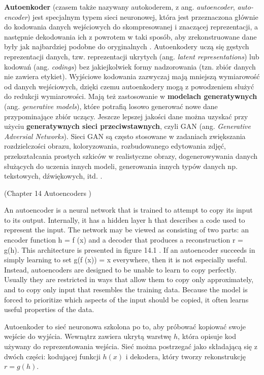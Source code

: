 \documentclass[12pt]{mwbk}
\theoremstyle{plain}
\theoremstyle{definition}
\theoremstyle{remark}
\begin{document}
	\textbf{Autoenkoder} (czasem także nazywany autokoderem, z ang. \textit{autoencoder}, \textit{auto-encoder}) jest specjalnym typem sieci neuronowej, która jest przeznaczona głównie do kodowania danych wejściowych do skompresowanej i znaczącej reprezentacji, a następnie dekodowania ich z powrotem w taki sposób, aby zrekonstruowane dane były jak najbardziej podobne do oryginalnych \cite{bank}. Autoenkodery uczą się gęstych reprezentacji danych, tzw. reprezentacji ukrytych (ang. \emph{latent representations}) lub kodowań (ang. \emph{codings}) bez jakiejkolwiek formy nadzorowania (tzn. zbiór danych nie zawiera etykiet). Wyjściowe kodowania zazwyczaj mają mniejszą wymiarowość od danych wejściowych, dzięki czemu autoenkodery mogą z powodzeniem służyć do redukcji wymiarowości. Mają też zastosowanie w \textbf{modelach generatywnych} (ang. \emph{generative models}), które potrafią losowo generować nowe dane przypominające zbiór uczący. Jeszcze lepszej jakości dane można uzyskać przy użyciu \textbf{generatywnych sieci przeciwstawnych}, czyli GAN (ang. \textit{Generative Adversial Networks}). Sieci GAN są często stosowane w zadaniach zwiększania rozdzielczości obrazu, koloryzowania, rozbudowanego edytowania zdjęć, przekształcania prostych szkiców w realistyczne obrazy, dogenerowywania danych służących do uczenia innych modeli, generowania innych typów danych np. tekstowych, dźwiękowych, itd. \cite{geron}.


(Chapter 14 Autoencoders \cite{goodfellow})

An autoencoder is a neural network that is trained to attempt to copy its input
to its output. Internally, it has a hidden layer h that describes a code used to
represent the input. The network may be viewed as consisting of two parts: an
encoder function h = f (x) and a decoder that produces a reconstruction r = g(h).
This architecture is presented in figure 14.1 . If an autoencoder succeeds in simply
learning to set g(f (x)) = x everywhere, then it is not especially useful. Instead,
autoencoders are designed to be unable to learn to copy perfectly. Usually they are
restricted in ways that allow them to copy only approximately, and to copy only
input that resembles the training data. Because the model is forced to prioritize
which aspects of the input should be copied, it often learns useful properties of the
data.

Autoenkoder to sieć neuronowa szkolona po to, aby próbować kopiować swoje wejście do wyjścia. Wewnątrz zawiera ukrytą warstwę $h$, która opisuje kod używany do reprezentowania wejścia. Sieć można postrzegać jako składającą się z dwóch części: kodującej funkcji $h(x)$ i dekodera, który tworzy rekonstrukcję $r=g(h)$.
\end{document}
